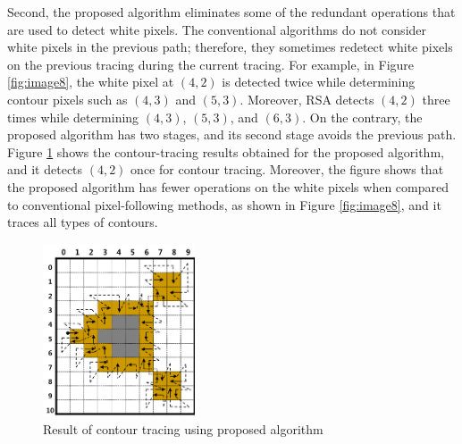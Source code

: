 
Second, the proposed algorithm eliminates some of the redundant operations that are used to detect white pixels. The conventional algorithms do not consider white pixels in the previous path; therefore, they sometimes redetect white pixels on the previous tracing during the current tracing. For example, in Figure \ref{fig:image8}, the white pixel at $(4, 2)$ is detected twice while determining contour pixels such as $(4, 3)$ and $(5, 3)$. Moreover, RSA detects $(4, 2)$ three times while determining $(4, 3)$, $(5, 3)$, and $(6, 3)$. On the contrary, the proposed algorithm has two stages, and its second stage avoids the previous path. Figure \ref{fig:image11} shows the contour-tracing results obtained for the proposed algorithm, and it detects $(4, 2)$ once for contour tracing. Moreover, the figure shows that the proposed algorithm has fewer operations on the white pixels when compared to conventional pixel-following methods, as shown in Figure \ref{fig:image8}, and it traces all types of contours. 

\begin{figure}[htbp]
	\centering
	\includegraphics[width=0.4\textwidth]{4.Proposed/fig11.png}
	\caption{Result of contour tracing using proposed algorithm}
	\label{fig:image11}
\end{figure}

